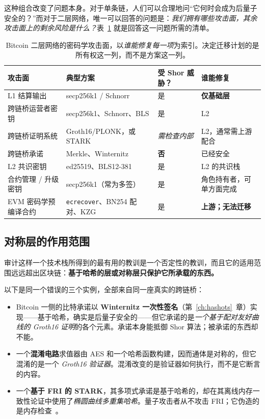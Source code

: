 这种组合改变了问题本身。对于单条链，人们可以合理地问“它何时会成为后量子安全的？”而对于二层网络，唯一可以回答的问题是：\emph{我们拥有哪些攻击面，其余攻击面上的剩余风险是什么？}表~\ref{tab:l2-surfaces} 就是回答这一问题所需的清单。

\begin{table}[H]
\centering
\small
\begin{tabular}{@{}p{3.6cm}p{4.3cm}p{2.0cm}p{3.6cm}@{}}
\toprule
攻击面 & 典型方案 & 受 Shor 威胁？ & 谁能修复 \\
\midrule
L1 结算输出 & secp256k1 / Schnorr & 是 & \textbf{仅基础层} \\
跨链桥运营者密钥 & secp256k1、Schnorr、BLS & 是 & L2 \\
跨链桥证明系统 & Groth16/PLONK，或 STARK & \emph{需检查内部} & L2，通常需上游配合 \\
跨链桥承诺 & Merkle、Winternitz & \textbf{否} & 已经安全 \\
L2 共识密钥 & ed25519、BLS12-381 & 是 & L2 的共识栈 \\
合约管理 / 升级密钥 & secp256k1（常为多签） & 是 & 角色持有者，可单方面完成 \\
EVM 密码学预编译合约 & \texttt{ecrecover}、BN254 配对、KZG & 是 & \textbf{上游；无法迁移} \\
\bottomrule
\end{tabular}
\caption{Bitcoin 二层网络的密码学攻击面，以\emph{谁能修复每一项}为索引。决定迁移计划的是所有权这一列，而不是方案这一列。}
\label{tab:l2-surfaces}
\end{table}

\subsection{对称层的作用范围}
\label{sec:symmetric-plumbing}
审计这样一个技术栈所得到的最有用的教训是一个否定性的教训，而且它的适用范围远远超出区块链：\textbf{基于哈希的层或对称层只保护它所承载的东西。}

以下是同一个错误的三个实例，全部来自同一座真实的跨链桥：
\begin{itemize}
  \item Bitcoin 一侧的比特承诺以 \textbf{Winternitz 一次性签名}（第~\ref{ch:hashots}~章）实现——基于哈希，确实是后量子安全的——但它承诺的是\emph{一个基于配对友好曲线的 Groth16 证明}的各个元素。承诺本身能抵御 Shor 算法；被承诺的东西却不能。
  \item 一个\textbf{混淆电路}求值器由 AES 和一个哈希函数构建，因而通体是对称的，但它混淆的是一个 \emph{Groth16 验证器}。混淆改变的是验证器如何执行，而不是它断言的内容。
  \item 一个\textbf{基于 FRI 的 STARK}，其多项式承诺是基于哈希的，却在其离线内存一致性论证中使用了\emph{椭圆曲线多重集哈希}。量子攻击者从不攻击 FRI；它伪造的是内存检查~\cite{ziren276}。
\end{itemize}

